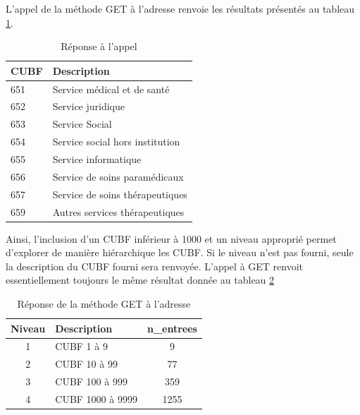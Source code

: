 L'appel de la méthode GET à l'adresse \fg{} renvoie les résultats présentés au tableau \ref{tab:get-cubf-niv3}.\par
\begin{table}[h]
    \centering
    \caption{Réponse à l'appel \fg{}}
    \label{tab:get-cubf-niv3}
    \begin{tabular}{ll}
        \toprule
         CUBF & Description \\
         \midrule
         651 & Service médical et de santé \\
         652 & Service juridique\\
         653 & Service Social\\
         654 & Service social hors institution\\
         655 & Service informatique\\
         656 & Service de soins paramédicaux \\
         657 & Service de soins thérapeutiques\\
         659 & Autres services thérapeutiques\\\bottomrule
    \end{tabular}
    
\end{table}
Ainsi, l'inclusion d'un \ac{CUBF} inférieur à 1000 et un niveau approprié permet d'explorer de manière hiérarchique les \ac{CUBF}. Si le niveau n'est pas fourni, seule la description du \ac{CUBF} fourni sera renvoyée.
L'appel à GET  \fg{} renvoit essentiellement toujours le même résultat donnée au tableau \ref{tab:get-cubf-n-entrees}
\begin{table}[h]
    \centering
    \caption{Réponse de la méthode GET à l'adresse  \fg{}}
    \label{tab:get-cubf-n-entrees}
    \begin{tabular}{clc}
        \toprule
        Niveau & Description & n\_entrees\\
        \midrule
        1 & CUBF 1 à 9 & 9 \\
        2 & CUBF 10 à 99 & 77\\
        3 & CUBF 100 à 999 & 359 \\
        4 & CUBF 1000 à 9999 & 1255\\
        \bottomrule
    \end{tabular}
    
\end{table}

